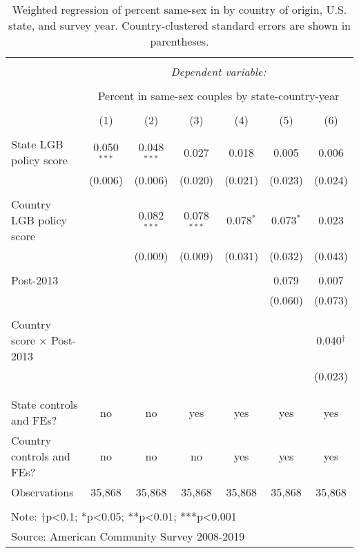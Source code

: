\documentclass[
  11pt,
]{article}
\begin{document}
\begin{table}[!htbp] \centering 
  \caption{Weighted regression of percent same-sex in by country of origin, U.S. state, and survey year. Country-clustered standard errors are shown in parentheses.} 
  \label{tab:state-props} 
\begin{tabular}{@{\extracolsep{5pt}}lcccccc} 
\\[-1.8ex]\hline 
\hline \\[-1.8ex] 
 & \multicolumn{6}{c}{\textit{Dependent variable:}} \\ 
\cline{2-7} 
\\[-1.8ex] & \multicolumn{6}{c}{Percent in same-sex couples by state-country-year} \\ 
\\[-1.8ex] & (1) & (2) & (3) & (4) & (5) & (6)\\ 
\hline \\[-1.8ex] 
 State LGB policy score & 0.050$^{***}$ & 0.048$^{***}$ & 0.027 & 0.018 & 0.005 & 0.006 \\ 
  & (0.006) & (0.006) & (0.020) & (0.021) & (0.023) & (0.024) \\ 
  & & & & & & \\ 
 Country LGB policy score &  & 0.082$^{***}$ & 0.078$^{***}$ & 0.078$^{*}$ & 0.073$^{*}$ & 0.023 \\ 
  &  & (0.009) & (0.009) & (0.031) & (0.032) & (0.043) \\ 
  & & & & & & \\ 
 Post-2013 &  &  &  &  & 0.079 & 0.007 \\ 
  &  &  &  &  & (0.060) & (0.073) \\ 
  & & & & & & \\ 
 Country score × Post-2013 &  &  &  &  &  & 0.040$^{†}$ \\ 
  &  &  &  &  &  & (0.023) \\ 
  & & & & & & \\ 
\hline \\[-1.8ex] 
State controls and FEs? & no & no & yes & yes & yes & yes \\ 
Country controls and FEs? & no & no & no & yes & yes & yes \\ 
Observations & 35,868 & 35,868 & 35,868 & 35,868 & 35,868 & 35,868 \\ 
\hline 
\hline \\[-1.8ex] 
\multicolumn{7}{l}{Note: †p<0.1; *p<0.05; **p<0.01; ***p<0.001} \\ 
\multicolumn{7}{l}{Source: American Community Survey 2008-2019} \\ 
\end{tabular} 
\end{table}
\end{document}

